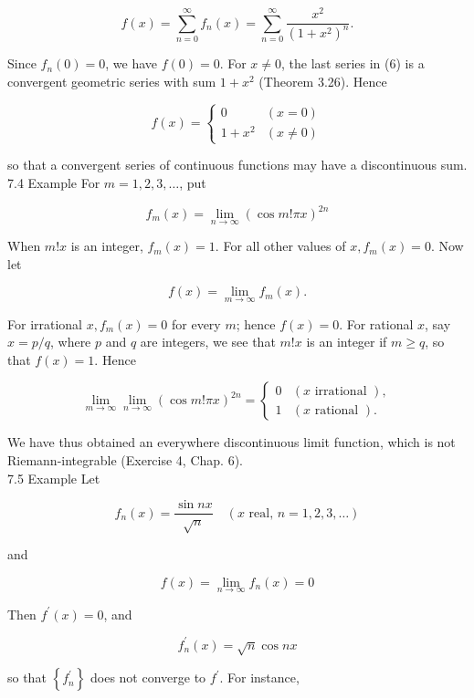\documentclass[10pt]{article}
\begin{document}
\begin{equation*}
f(x)=\sum_{n=0}^{\infty} f_{n}(x)=\sum_{n=0}^{\infty} \frac{x^{2}}{\left(1+x^{2}\right)^{n}} . \tag{6}
\end{equation*}


Since $f_{n}(0)=0$, we have $f(0)=0$. For $x \neq 0$, the last series in (6) is a convergent geometric series with sum $1+x^{2}$ (Theorem 3.26). Hence

\[
f(x)= \begin{cases}0 & (x=0)  \tag{7}\\ 1+x^{2} & (x \neq 0)\end{cases}
\]

so that a convergent series of continuous functions may have a discontinuous sum.\\
7.4 Example For $m=1,2,3, \ldots$, put

$$
f_{m}(x)=\lim _{n \rightarrow \infty}(\cos m!\pi x)^{2 n}
$$

When $m!x$ is an integer, $f_{m}(x)=1$. For all other values of $x, f_{m}(x)=0$. Now let

$$
f(x)=\lim _{m \rightarrow \infty} f_{m}(x) .
$$

For irrational $x, f_{m}(x)=0$ for every $m$; hence $f(x)=0$. For rational $x$, say $x=p / q$, where $p$ and $q$ are integers, we see that $m!x$ is an integer if $m \geq q$, so that $f(x)=1$. Hence

\[
\lim _{m \rightarrow \infty} \lim _{n \rightarrow \infty}(\cos m!\pi x)^{2 n}= \begin{cases}0 & (x \text { irrational }),  \tag{8}\\ 1 & (x \text { rational }) .\end{cases}
\]

We have thus obtained an everywhere discontinuous limit function, which is not Riemann-integrable (Exercise 4, Chap. 6).\\
7.5 Example Let


\begin{equation*}
f_{n}(x)=\frac{\sin n x}{\sqrt{n}} \quad(x \text { real, } n=1,2,3, \ldots) \tag{9}
\end{equation*}


and

$$
f(x)=\lim _{n \rightarrow \infty} f_{n}(x)=0
$$

Then $f^{\prime}(x)=0$, and

$$
f_{n}^{\prime}(x)=\sqrt{n} \cos n x
$$

so that $\left\{f_{n}^{\prime}\right\}$ does not converge to $f^{\prime}$. For instance,
\end{document}
